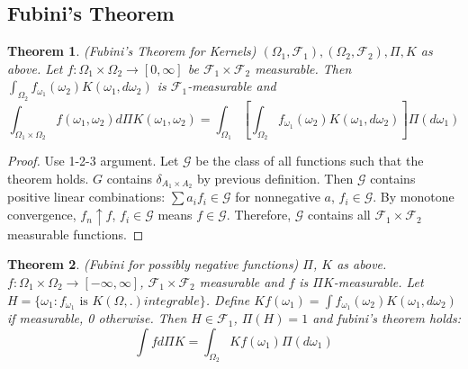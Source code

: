 \documentclass[12pt]{article}
\newtheorem{theorem}{Theorem}
\begin{document}
\subsection{Fubini's Theorem}
\begin{theorem}
(Fubini's Theorem for Kernels) $(\Omega_1, \mathcal{F}_1), (\Omega_2, \mathcal{F}_2), \Pi, K$ as above.  Let $f: \Omega_1 \times \Omega_2 \rightarrow [0, \infty]$ be $\mathcal{F}_1 \times \mathcal{F}_2$ measurable.  Then $\int_{\Omega_2} f_{\omega_1}(\omega_2) K(\omega_1, d \omega_2)$ is $\mathcal{F}_1$-measurable and
$$\int_{\Omega_1 \times \Omega_2} f(\omega_1, \omega_2) d \Pi K(\omega_1, \omega_2) = \int_{\Omega_1} [\int_{\Omega_2} f_{\omega_1}(\omega_2) K(\omega_1, d \omega_2) ] \Pi (d \omega_1)$$
\end{theorem}
\begin{proof}
Use 1-2-3 argument.  Let $\mathcal{G}$ be the class of all functions such that the theorem holds.  $G$ contains $\delta_{A_1 \times A_2}$ by previous definition.  Then $\mathcal{G}$ contains positive linear combinations: $\sum a_i f_i \in \mathcal{G}$ for nonnegative $a$, $f_i \in \mathcal{G}$.  By monotone convergence, $f_n \uparrow f$, $f_i \in \mathcal{G}$ means $f \in \mathcal{G}$.  Therefore, $\mathcal{G}$ contains all $\mathcal{F}_1 \times \mathcal{F}_2$ measurable functions.
\end{proof}

\begin{theorem}
(Fubini for possibly negative functions) $\Pi$, $K$ as above. $f : \Omega_1 \times \Omega_2 \rightarrow [-\infty, \infty]$, $\mathcal{F}_1 \times \mathcal{F}_2$ measurable and $f$ is $\Pi K$-measurable.  Let $H = \{\omega_1 : f_{\omega_1} \textrm{ is } K(\Omega, .) integrable \}$.  Define $K f(\omega_1) = \int f_{\omega_1}(\omega_2) K(\omega_1, d \omega_2)$ if measurable, 0 otherwise.  Then $H \in \mathcal{F}_1$, $\Pi(H) = 1$ and fubini's theorem holds:
$$\int f d \Pi K = \int_{\Omega_2} K f(\omega_1) \Pi(d \omega_1)$$
\end{theorem}
\end{document}
